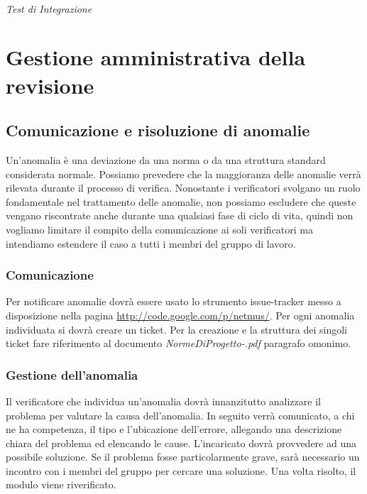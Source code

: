 \subparagraph{Test di Integrazione}



\chapter{Gestione amministrativa della \\revisione}
\thispagestyle{fancy} %

\section{Comunicazione e risoluzione di anomalie}

Un'anomalia \`e una deviazione da una norma o da una struttura standard
considerata normale. Possiamo prevedere che la maggioranza delle anomalie verr\`a 
rilevata durante il processo di verifica. Nonostante i verificatori svolgano un
ruolo fondamentale nel trattamento delle anomalie, non possiamo escludere che
queste vengano riscontrate anche durante una qualsiasi fase di ciclo di vita,
quindi non vogliamo limitare il compito della comunicazione ai soli verificatori ma 
intendiamo estendere il caso a tutti i membri del gruppo di lavoro.

\subsection{Comunicazione}

Per notificare anomalie dovr\`a essere usato lo strumento issue-tracker messo a
disposizione nella pagina \url{http://code.google.com/p/netmus/}. Per ogni
anomalia individuata si dovr\`a creare un ticket. Per la creazione e la struttura dei
singoli ticket fare riferimento al documento \emph{NormeDiProgetto-\versionenormeprogetto.pdf} paragrafo omonimo.


\subsection{Gestione dell'anomalia}

Il verificatore che individua un'anomalia dovr\`a innanzitutto analizzare il
problema per valutare la causa dell'anomalia.
In seguito verr\`a comunicato, a chi ne ha competenza, il tipo e l'ubicazione
dell'errore, allegando una descrizione chiara del problema ed elencando le
cause. L'incaricato dovr\`a provvedere ad una possibile soluzione. Se il
problema fosse particolarmente grave, sar\`a necessario un incontro con i membri 
del gruppo per cercare una soluzione. Una volta risolto, il modulo viene
riverificato.

